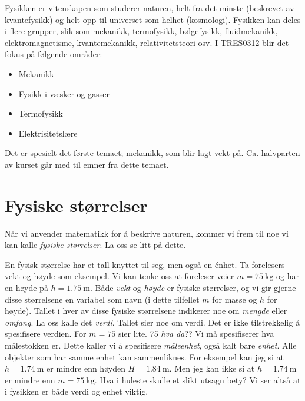 Fysikken er vitenskapen som studerer naturen, helt fra det minste (beskrevet av kvantefysikk) og helt opp til universet som helhet (kosmologi). Fysikken kan deles i flere grupper, slik som mekanikk, termofysikk, bølgefysikk, fluidmekanikk, elektromagnetisme, kvantemekanikk, relativitetsteori osv. I TRES0312 blir det fokus på følgende områder:
\begin{itemize}
    \item Mekanikk
    \vspace{-0.75em}
    \item Fysikk i væsker og gasser
    \vspace{-0.75em}
    \item Termofysikk
    \vspace{-0.75em}
    \item Elektrisitetslære
\end{itemize}
Det er spesielt det første temaet; mekanikk, som blir lagt vekt på. Ca. halvparten av kurset går med til emner fra dette temaet.

\section{Fysiske størrelser}
Når vi anvender matematikk for å beskrive naturen, kommer vi frem til noe vi kan kalle \textit{fysiske størrelser}. La oss se litt på dette.

En fysisk størrelse har et tall knyttet til seg, men også en énhet. Ta forelesers vekt og høyde som eksempel. Vi kan tenke oss at foreleser veier $m=\SI{75}{\kilo\gram}$ og har en høyde på $h=\SI{1.75}{\metre}$. Både \textit{vekt} og \textit{høyde} er fysiske størrelser, og vi gir gjerne disse størrelsene en variabel som navn (i dette tilfellet $m$ for masse og $h$ for høyde). Tallet i hver av disse fysiske størrelsene indikerer noe om \textit{mengde} eller \textit{omfang}. La oss kalle det \textit{verdi}.  Tallet sier noe om verdi.
Det er ikke tilstrekkelig å spesifisere verdien. For $m=75$ sier lite. 75 \textit{hva da}?? Vi må spesifiserer hva målestokken er. Dette kaller vi å spesifisere \textit{måleenhet}, også kalt bare \textit{enhet}. Alle objekter som har samme enhet kan sammenliknes. For eksempel kan jeg si at $h=\SI{1.74}{\metre}$ er mindre enn høyden $H=\SI{1.84}{\metre}$. Men jeg kan ikke si at $h=\SI{1.74}{\metre}$ er mindre enn $m=\SI{75}{\kilo\gram}$. Hva i huleste skulle et slikt utsagn bety? Vi ser altså at i fysikken er både verdi og enhet viktig.



